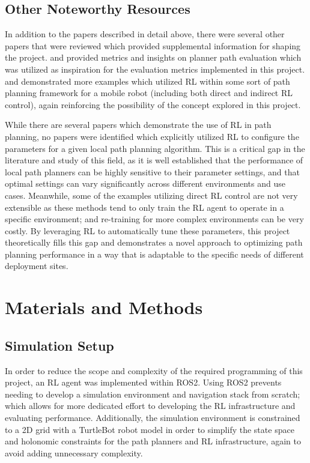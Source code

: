 \documentclass[conference]{IEEEtran}
\begin{document}
        \subsection{Other Noteworthy Resources}
        In addition to the papers described in detail above, there were several other papers that were reviewed which provided supplemental
        information for shaping the project. \cite{b5} and \cite{b6} provided metrics and insights on planner path evaluation which was utilized as
        inspiration for the evaluation metrics implemented in this project. \cite{b7} and \cite{b8} demonstrated more examples which utilized RL
        within some sort of path planning framework for a mobile robot (including both direct and indirect RL control), again reinforcing the
        possibility of the concept explored in this project.
        
        While there are several papers which demonstrate the use of RL in path planning, no papers were identified which explicitly utilized RL to
        configure the parameters for a given local path planning algorithm. This is a critical gap in the literature and study of this field, as it
        is well established that the performance of local path planners can be highly sensitive to their parameter settings, and that optimal settings
        can vary significantly across different environments and use cases. Meanwhile, some of the examples utilizing direct RL control are not very
        extensible as these methods tend to only train the RL agent to operate in a specific environment; and re-training for more complex
        environments can be very costly. By leveraging RL to automatically tune these parameters, this project theoretically fills this gap and
        demonstrates a novel approach to optimizing path planning performance in a way that is adaptable to the specific needs of different
        deployment sites.

\section{Materials and Methods}\label{sec:pq_metrics}
    \subsection{Simulation Setup}
    In order to reduce the scope and complexity of the required programming of this project, an RL agent was implemented within ROS2. Using ROS2
    prevents needing to develop a simulation environment and navigation stack from scratch; which allows for more dedicated effort to developing
    the RL infrastructure and evaluating performance. Additionally, the simulation environment is constrained to a 2D grid with a TurtleBot robot
    model in order to simplify the state space and holonomic constraints for the path planners and RL infrastructure, again to avoid adding unnecessary complexity.
    
\end{document}

